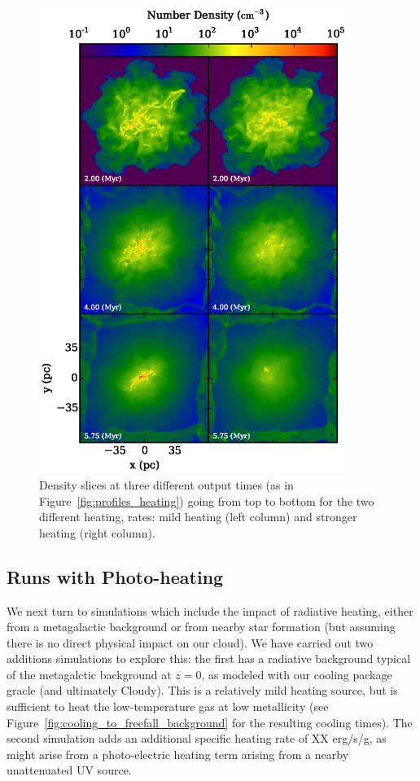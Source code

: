\documentclass[useAMS,usenatbib]{mn2e}
\begin{document}

\begin{figure}
\begin{center}
\includegraphics[width=10cm]{Images/density_heating_panel}
\end{center}
\caption{\label{fig:density_heating}
Density slices at three different output times (as in Figure~\ref{fig:profiles_heating}) going
from top to bottom for the two different heating, rates: mild heating (left column) and
stronger heating (right column).
}
\end{figure}

\subsection{Runs with Photo-heating}

We next turn to simulations which include the impact of radiative heating, either from a metagalactic background or from nearby star formation (but assuming there is no direct physical impact on our cloud).  We have carried out two additions simulations to explore this: the first has a radiative background typical of the \citet{Haardt2012} metagalctic background at $z=0$, as modeled with our cooling package {\sc gracle} (and ultimately Cloudy).  This is a relatively mild heating source, but is sufficient to heat the low-temperature gas at low metallicity (see Figure~\ref{fig:cooling_to_freefall_background} for the resulting cooling times).  The second simulation adds an additional specific heating rate of XX erg/s/g, as might arise from a photo-electric heating term arising from a nearby unattenuated UV source. 
\end{document}
